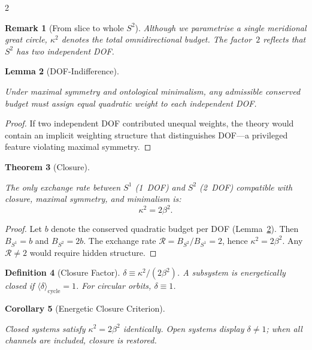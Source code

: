 \documentclass[10pt, a4paper]{article}
\newtheorem{theorem}{Theorem}[section]
\newtheorem{lemma}[theorem]{Lemma}
\newtheorem{corollary}[theorem]{Corollary}
\newtheorem{definition}[theorem]{Definition}
\newtheorem{remark}[theorem]{Remark}
\begin{document}
\begin{multicols}{2}
\begin{remark}[From slice to whole $S^2$]
Although we parametrise a single meridional great circle, $\kappa^2$ denotes the total omnidirectional budget. The factor~$2$ reflects that $S^2$ has two independent DOF.
\end{remark}

\begin{lemma}[DOF-Indifference]
\hypertarget{lem:dof-indifference}{}\label{lem:dof-indifference}
Under maximal symmetry and ontological minimalism, any admissible conserved budget must assign equal quadratic weight to each independent DOF.
\end{lemma}

\begin{proof}
If two independent DOF contributed unequal weights, the theory would contain an implicit weighting structure that distinguishes DOF---a privileged feature violating maximal symmetry.
\end{proof}

\begin{theorem}[Closure]
\hypertarget{thm:Closure}{}\label{thm:Closure}
The only exchange rate between $S^1$ (1~DOF) and $S^2$ (2~DOF) compatible with closure, maximal symmetry, and minimalism is:
\[
\boxed{\kappa^2 = 2\beta^2.}
\]
\end{theorem}

\begin{proof}
Let $b$ denote the conserved quadratic budget per DOF (Lemma~\ref{lem:dof-indifference}). Then $B_{S^1}=b$ and $B_{S^2}=2b$. The exchange rate $\mathcal{R}=B_{S^2}/B_{S^1}=2$, hence $\kappa^2=2\beta^2$. Any $\mathcal{R}\neq 2$ would require hidden structure.
\end{proof}

\hypertarget{def:closure_factor}{}\label{def:closure_factor}
\begin{definition}[Closure Factor]
$\delta \equiv \kappa^2/(2\beta^2)$.
A subsystem is energetically closed if $\langle\delta\rangle_{\text{cycle}}=1$. For circular orbits, $\delta \equiv 1$.
\end{definition}

\begin{corollary}[Energetic Closure Criterion]
\hypertarget{cor:closurecriterion}{}\label{cor:closurecriterion}
Closed systems satisfy $\kappa^2 = 2\beta^2$ identically. Open systems display $\delta \neq 1$; when all channels are included, closure is restored.
\end{corollary}



\end{multicols}
\end{document}
